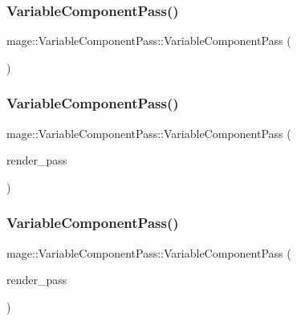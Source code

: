\subsubsection{\texorpdfstring{Variable\+Component\+Pass()}{VariableComponentPass()}\hspace{0.1cm}{\footnotesize\ttfamily [1/3]}}
{\footnotesize\ttfamily mage\+::\+Variable\+Component\+Pass\+::\+Variable\+Component\+Pass (\begin{DoxyParamCaption}{ }\end{DoxyParamCaption})}

\hypertarget{classmage_1_1_variable_component_pass_a535ac4989db673e69870090494f454dd}{}\label{classmage_1_1_variable_component_pass_a535ac4989db673e69870090494f454dd} 
\subsubsection{\texorpdfstring{Variable\+Component\+Pass()}{VariableComponentPass()}\hspace{0.1cm}{\footnotesize\ttfamily [2/3]}}
{\footnotesize\ttfamily mage\+::\+Variable\+Component\+Pass\+::\+Variable\+Component\+Pass (\begin{DoxyParamCaption}\item[{const \hyperlink{classmage_1_1_variable_component_pass}{Variable\+Component\+Pass} \&}]{render\+\_\+pass }\end{DoxyParamCaption})\hspace{0.3cm}{\ttfamily [delete]}}

\hypertarget{classmage_1_1_variable_component_pass_a2721ef623ca91abfac8ae7092094a0fb}{}\label{classmage_1_1_variable_component_pass_a2721ef623ca91abfac8ae7092094a0fb} 
\subsubsection{\texorpdfstring{Variable\+Component\+Pass()}{VariableComponentPass()}\hspace{0.1cm}{\footnotesize\ttfamily [3/3]}}
{\footnotesize\ttfamily mage\+::\+Variable\+Component\+Pass\+::\+Variable\+Component\+Pass (\begin{DoxyParamCaption}\item[{\hyperlink{classmage_1_1_variable_component_pass}{Variable\+Component\+Pass} \&\&}]{render\+\_\+pass }\end{DoxyParamCaption})\hspace{0.3cm}{\ttfamily [default]}}

